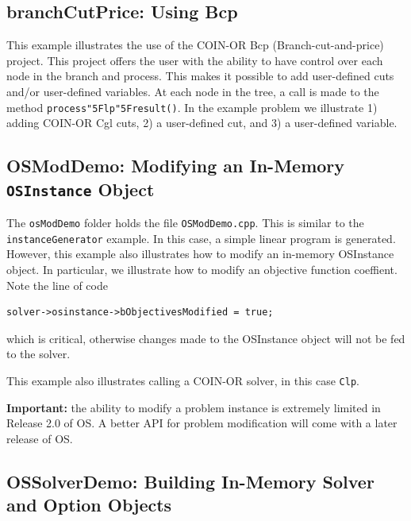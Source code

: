 \documentclass[11pt]{article}
\renewcommand{\_}{{\char"5F}}
\renewcommand{\{}{{\char"7B}}
\renewcommand{\}}{{\char"7D}}
\renewcommand{\^}{{\char"0D}}
\renewcommand{\'}{{\char"0D}}
\begin{document}
\begin{enumerate}[Step 1:]

\subsection{branchCutPrice:  Using Bcp}\label{section:examplebranchCutPrice}

This example illustrates the use of the COIN-OR Bcp (Branch-cut-and-price) project.  This project offers the user with the ability to have control over each node in the branch and process. This makes it possible to add user-defined cuts and/or user-defined variables. At each node in the tree, a call is made to the method {\tt process\_lp\_result()}. In the example problem we illustrate 1) adding COIN-OR Cgl cuts, 2) a user-defined cut, and 3) a user-defined variable. 


\subsection{OSModDemo: Modifying an In-Memory {\tt OSInstance} Object}\label{section:exampleOSModDemo}

The {\tt osModDemo} folder holds the file {\tt OSModDemo.cpp}. This is similar to the {\tt instanceGenerator} example.
In this case, a simple linear program is generated. However, this example also illustrates how to modify an in-memory OSInstance object. In particular, we illustrate how to modify an objective function coeffient. Note the line of code 

\begin{verbatim}
solver->osinstance->bObjectivesModified = true;
\end{verbatim}
which is critical, otherwise changes made to the OSInstance object will not be fed to the solver. 

This example also illustrates calling a COIN-OR solver,
in this case {\tt Clp}.

\vskip 8pt

{\bf Important:} the ability to modify a problem instance is extremely limited in Release 2.0 of OS. A better API for problem modification will come with a later release of OS.



\subsection{OSSolverDemo: Building In-Memory Solver and Option Objects}\label{section:exampleOSSolverDemo}


\end{enumerate}
\end{document}
